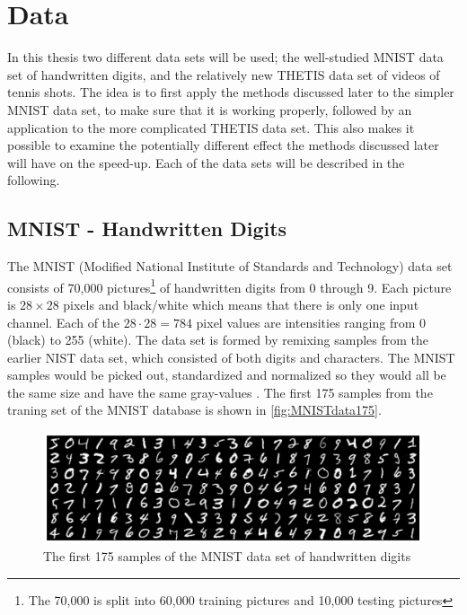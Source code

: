 \section{Data} \label{tex:data}

In this thesis two different data sets will be used; the well-studied MNIST data set \cite{MNIST} of handwritten digits, and the relatively new THETIS data set \cite{Gourgari2013} of videos of tennis shots. The idea is to first apply the methods discussed later to the simpler MNIST data set, to make sure that it is working properly, followed by an application to the more complicated THETIS data set. This also makes it possible to examine the potentially different effect the methods discussed later will have on the speed-up. Each of the data sets will be described in the following. 

\subsection{MNIST - Handwritten Digits}
The MNIST (Modified National Institute of Standards and Technology) data set \cite{MNIST} consists of 70,000 pictures\footnote{The 70,000 is split into 60,000 training pictures and 10,000 testing pictures} of handwritten digits from 0 through 9. Each picture is $28\times 28$ pixels and black/white which means that there is only one input channel. Each of the $28\cdot 28 = 784$ pixel values are intensities ranging from 0 (black) to 255 (white). The data set is formed by remixing samples from the earlier NIST data set, which consisted of both digits and characters. The MNIST samples would be picked out, standardized and normalized so they would all be the same size and have the same gray-values \cite{mnistdatabase}. The first 175 samples from the traning set of the MNIST database is shown in \autoref{fig:MNISTdata175}. 

\begin{figure}[H]
    \centering
    \includegraphics[width=\linewidth]{Pics/04_Data/MNIST.png}
    \caption{The first 175 samples of the MNIST data set of handwritten digits}
    \label{fig:MNISTdata175}
\end{figure}

